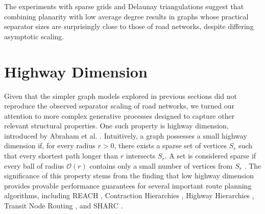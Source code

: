 The experiments with sparse grids and Delaunay triangulations suggest that combining planarity with low average degree results in graphs whose practical separator sizes are surprisingly close to those of road networks, despite differing asymptotic scaling.

\section{Highway Dimension}
\label{sec:synthetic:highway_dimension}

Given that the simpler graph models explored in previous sections did not reproduce the observed  separator scaling of road networks, we turned our attention to more complex generative processes designed to capture other relevant structural properties.
One such property is highway dimension, introduced by Abraham et al. \cite{abraham_highway_2010}.
Intuitively, a graph possesses a small highway dimension if, for every radius \(r > 0\), there exists a sparse set of vertices \(S_r\) such that every shortest path longer than \(r\) intersects \(S_r\).
A set is considered sparse if every ball of radius \(\mathcal{O}(r)\) contains only a small number of vertices from \(S_r\) \cite{abraham_highway_2010}.
The significance of this property stems from the finding that low highway dimension provides provable performance guarantees for several important route planning algorithms, including REACH \cite{goldberg_reach_2006}, Contraction Hierarchies \cite{geisberger_contraction_2008}, Highway Hierarchies \cite{sanders_highway_2005}, Transit Node Routing \cite{bast_fast_2007}, and SHARC \cite{bauer_sharc_2010}.

